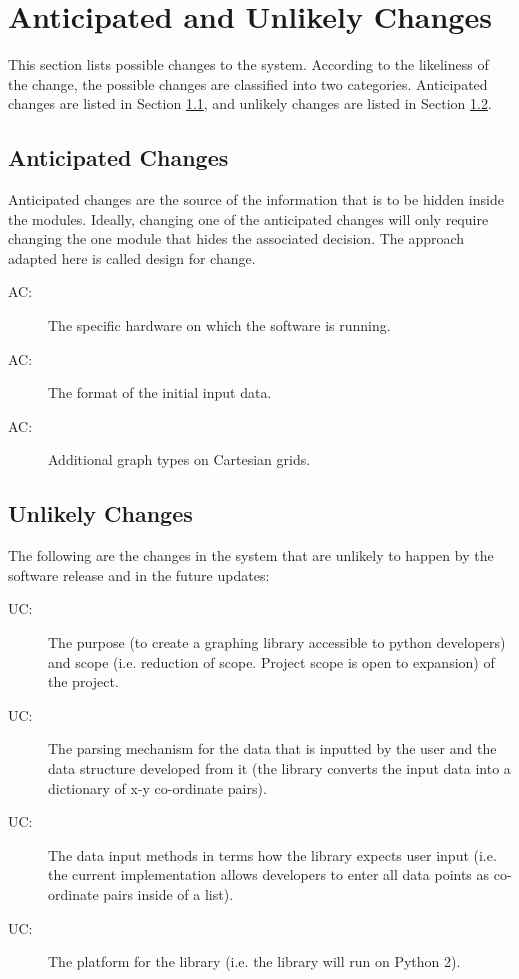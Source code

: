 \documentclass[12pt, titlepage]{article}
\newcounter{acnum}
\newcommand{\actheacnum}{AC\theacnum}
\newcounter{ucnum}
\newcommand{\uctheucnum}{UC\theucnum}
\begin{document}
\section{Anticipated and Unlikely Changes} \label{SecChange}

This section lists possible changes to the system. According to the likeliness
of the change, the possible changes are classified into two
categories. Anticipated changes are listed in Section \ref{SecAchange}, and
unlikely changes are listed in Section \ref{SecUchange}.

\subsection{Anticipated Changes} \label{SecAchange}

Anticipated changes are the source of the information that is to be hidden
inside the modules. Ideally, changing one of the anticipated changes will only
require changing the one module that hides the associated decision. The approach
adapted here is called design for
change.

\begin{description}
\item[ \actheacnum \label{acHardware}:] The specific
  hardware on which the software is running.
\item[ \actheacnum \label{acInput}:] The format of the
  initial input data.
\item [ \actheacnum \label{acGraphType}:] Additional graph types on Cartesian grids.
\end{description}

\subsection{Unlikely Changes} \label{SecUchange}

The following are the changes in the system that are unlikely to happen by the software release and in the future updates:

\begin{description}
\item[ \uctheucnum \label{ucIO}:] The purpose (to create a graphing library accessible to python developers) and scope (i.e. reduction of scope. Project scope is open to expansion) of the project.
\item[ \uctheucnum \label{ucInput}:] The parsing mechanism for the data that is inputted by the user and the data structure developed from it (the library converts the input data into a dictionary of x-y co-ordinate pairs).
\item[ \uctheucnum \label{ucInput}:]The data input methods in terms how the library expects user input (i.e. the current implementation allows developers to enter all data points as co-ordinate pairs inside of a list).
\item[ \uctheucnum \label{ucInput}:]The platform for the library (i.e. the library will run on Python 2).
\end{description}
\end{document}

